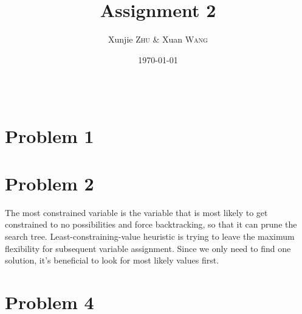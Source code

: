 \documentclass{article}
\title{Assignment 2} %
\author{Xunjie \textsc{Zhu}  \& Xuan \textsc{Wang}} %
\date{\today} %
\begin{document}
\maketitle %

\begin{center}
\begin{tabular}{l r}
\end{tabular}
\end{center}






\section{Problem 1}


\section{Problem 2}
The most constrained variable is the variable that is most likely to get constrained to no possibilities and force backtracking, so that it can prune the search tree. Least-constraining-value heuristic is trying to leave the maximum ﬂexibility for subsequent variable assignment. Since we only need to find one solution, it's beneficial to look for most likely values first.

\section{Problem 4}
\end{document}
